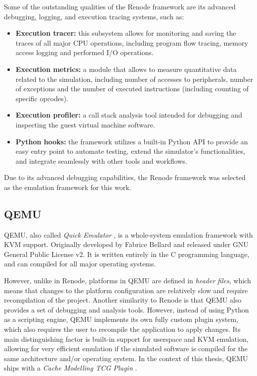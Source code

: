 Some of the outstanding qualities of the Renode framework are its advanced debugging, logging, and execution tracing systems, such as:
\begin{itemize}
	\item \textbf{Execution tracer:} this subsystem allows for monitoring and saving the traces of all major CPU operations, including program flow tracing, memory access logging and
		performed I/O operations.
	\item \textbf{Execution metrics:} a module that allows to measure quantitative data related to the simulation, including number of accesses to peripherals, number of exceptions and
		the number of executed instructions (including counting of specific opcodes).
	\item \textbf{Execution profiler:} a call stack analysis tool intended for debugging and inspecting the guest virtual machine software.
	\item \textbf{Python hooks:} the framework utilizes a built-in Python API to provide an easy entry point to automate testing, extend the simulator's functionalities, and integrate
		seamlessly with other tools and workflows.
\end{itemize}

\noindent Due to its advanced debugging capabilities, the Renode framework was selected as the emulation framework for this work.

\subsection{QEMU}

QEMU, also called \textit{Quick Emulator} \cite{qemuoriginal}, is a whole-system emulation framework with KVM support. Originally developed by Fabrice Bellard \cite{qemufabrice} and released
under GNU General Public License v2. It is written entirely in the C programming language, and can compiled for all major operating systems.

However, unlike in Renode, platforms in QEMU are defined in \textit{header files}, which means
that changes to the platform configuration are relatively slow and require recompilation of the project. Another similarity to Renode is that QEMU also provides a set of debugging
and analysis tools. However, instead of using Python as a scripting engine, QEMU implements its own fully custom plugin system, which also requires the user to recompile the
application to apply changes. Its main distinguishing factor is built-in support for userspace and KVM emulation, allowing for very efficient emulation if the simulated software is
compiled for the same architecture and/or operating system. In the context of this thesis, QEMU ships with a \textit{Cache Modelling TCG Plugin} \cite{tcgcachemodelling}.

